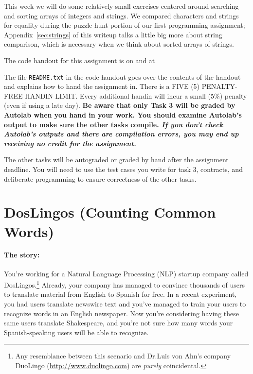 \documentclass[12pt]{exam}
\begin{document}
\hwTitle

\noindent
This week we will do some relatively small exercises centered around
searching and sorting arrays of integers and strings. We compared
characters and strings for equality during the puzzle hunt portion of
our first programming assignment; Appendix~\ref{sec:strings} of this
writeup talks a little big more about string comparison, which is
necessary when we think about sorted arrays of strings.

\bigskip
\noindent
The code handout for this assignment is on \autolab{} and at
\begin{center}
\end{center}

The file \lstinline'README.txt' in the code handout goes over the contents
of the handout and explains how to hand the assignment in.  There is
a FIVE (5) PENALTY-FREE HANDIN LIMIT.
Every additional handin will incur a small (5\%) penalty (even if
using a late day).
 {\bf Be aware that only Task 3 will be graded
  by Autolab when you hand in your work. You should examine Autolab's
  output to make sure the other tasks compile. \emph{If you
    don't check Autolab's outputs and there are compilation errors,
    you may end up receiving no credit for the assignment.}}

The other tasks will be autograded or graded by hand after the
assignment deadline. You will need to use the test cases you write for
task 3, contracts, and deliberate programming to ensure correctness of
the other tasks.

\newpage
\section{DosLingos (Counting Common Words)}
\label{sect:common}

\paragraph{The story:} %
You're working for a Natural Language Processing (NLP) startup company called
DosLingos.\footnote{Any resemblance between this scenario and Dr.\@ Luis von
  Ahn's company DuoLingo (\url{http://www.duolingo.com}) are \emph{purely}
  coincidental.}  Already, your company has managed to convince thousands of
users to translate material from English to Spanish for free. In a recent
experiment, you had users translate newswire text and you've managed to train
your users to recognize words in an English newspaper.  Now you're considering
having these same users translate Shakespeare, and you're not sure how many
words your Spanish-speaking users will be able to recognize.
\end{document}

